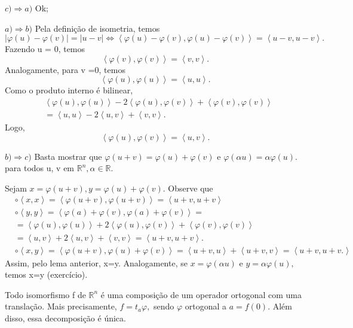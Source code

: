 \documentclass[Algebra/algebra_notes.tex]{subfiles}
\begin{document}
\begin{proof*}
	$c)\Rightarrow a)$ Ok;

	$a)\Rightarrow b)$ Pela definição de isometria, temos
	$$
		|\varphi (u)-\varphi (v)| = |u-v| \Longleftrightarrow \left< \varphi (u)-\varphi (v), \varphi (u)-\varphi (v) \right> =
		\left< u-v, u-v \right>.
	$$
	Fazendo u = 0, temos
	$$
		\left< \varphi (v), \varphi (v) \right> = \left< v, v \right>.
	$$
	Analogamente, para v =0, temos
	$$
		\left< \varphi (u), \varphi (u) \right> = \left< u, u \right>.
	$$
	Como o produto interno é bilinear,
	\begin{align*}
		 & \left< \varphi (u), \varphi (u) \right> - 2\left< \varphi (u), \varphi (v) \right> + \left< \varphi (v), \varphi (v) \right> \\
		 & =\left< u, u \right> - 2\left< u, v \right> + \left< v, v \right>.
	\end{align*}
	Logo,
	$$
		\left< \varphi (u), \varphi (v) \right> = \left< u, v \right>.
	$$

	$b)\Rightarrow c)$ Basta mostrar que $\varphi (u+v)=\varphi (u)+\varphi (v)$ e $\varphi (\alpha u) = \alpha \varphi (u).$
	para todos u, v em $\mathbb{R}^{n}, \alpha \in \mathbb{R}.$

	Sejam $x=\varphi (u+v), y=\varphi (u)+\varphi (v).$ Observe que
	\begin{align*}
		 & \circ{}\left< x, x \right>=\left< \varphi (u+v), \varphi (u+v) \right> = \left< u+v, u+v \right>                                                      \\
		 & \circ{}\left< y, y \right> = \left< \varphi (a)+\varphi (v), \varphi (a)+\varphi (v) \right> =                                                        \\
		 & =\left< \varphi (u), \varphi (u) \right> + 2\left< \varphi (u),\varphi (v) \right> + \left< \varphi (v), \varphi (v) \right>                          \\
		 & =\left< u, v \right> +2\left< u, v \right> + \left< v, v \right> = \left< u+v, u+v \right>.                                                           \\
		 & \circ{}\left< x, y \right>=\left< \varphi (u+v), \varphi (u)+\varphi (v) \right>=\left< u+v, u \right>+\left< u+v, v \right>=\left< u+v, u+v. \right>
	\end{align*}
	Assim, pelo lema anterior, x=y. Analogamente, se $x=\varphi (\alpha u)$ e $y=\alpha \varphi (u),$ temos x=y (exercício). \qedsymbol
\end{proof*}
\begin{crl*}
	Todo isomorfismo f de $\mathbb{R}^{n}$ é uma composição de um operador ortogonal com uma translação. Mais precisamente,
	$f=t_{a}\varphi,$ sendo $\varphi $ ortogonal a $a=f(0).$ Além disso, essa decomposição é única.
\end{crl*}
\end{document}
